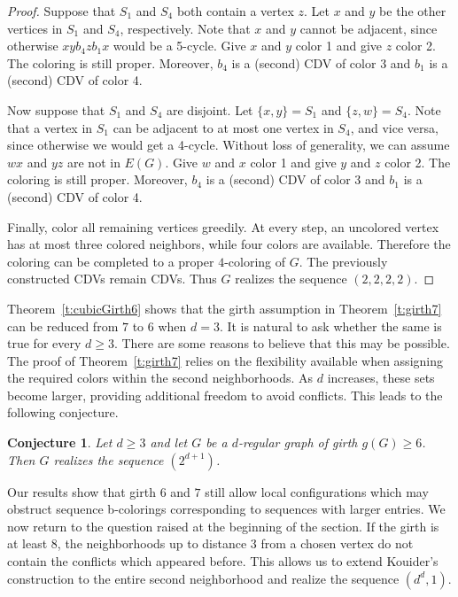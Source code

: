 \documentclass{article}
\newtheorem{conjecture}[theorem]{Conjecture}
\theoremstyle{definition}
\begin{document}
\begin{proof}
Suppose that $S_1$ and $S_4$ both contain a vertex $z$.
Let $x$ and $y$ be the other vertices in $S_1$ and $S_4$, respectively.
Note that $x$ and $y$ cannot be adjacent, since otherwise $xyb_4zb_1x$ would be a 5-cycle.
Give $x$ and $y$ color 1 and give $z$ color 2.
The coloring is still proper.
Moreover, $b_4$ is a (second) CDV of color 3 and $b_1$ is a (second) CDV of color 4.

Now suppose that $S_1$ and $S_4$ are disjoint.
Let $\{x,y\}=S_1$ and $\{z,w\}=S_4$.
Note that a vertex in $S_1$ can be adjacent to at most one vertex in $S_4$, and vice versa, since otherwise we would get a 4-cycle.
Without loss of generality, we can assume $wx$ and $yz$ are not in $E(G)$.
Give $w$ and $x$ color 1 and give $y$ and $z$ color 2.
The coloring is still proper.
Moreover, $b_4$ is a (second) CDV of color 3 and $b_1$ is a (second) CDV of color 4.

\smallskip

Finally, color all remaining vertices greedily. At every step, an uncolored vertex has at most three colored neighbors, while four colors are available. Therefore the coloring can be completed to a proper $4$-coloring of $G$. The previously constructed CDVs remain CDVs. Thus $G$ realizes the sequence $(2,2,2,2)$.
\end{proof}

\medskip

Theorem~\ref{t:cubicGirth6} shows that the girth assumption in Theorem~\ref{t:girth7} can be reduced from $7$ to $6$ when $d=3$. It is natural to ask whether the same is true for every $d\geq 3$. There are some reasons to believe that this may be possible. The proof of Theorem~\ref{t:girth7} relies on the flexibility available when assigning the required colors within the second neighborhoods. As $d$ increases, these sets become larger, providing additional freedom to avoid conflicts. This leads to the following conjecture.

\begin{conjecture}\label{c:girth6}
Let $d\geq 3$ and let $G$ be a $d$-regular graph of girth $g(G)\ge 6$.
Then $G$ realizes the sequence $(2^{d+1})$.
\end{conjecture}

Our results %
show that girth $6$ and $7$ still allow local configurations which may obstruct sequence b-colorings corresponding to sequences with larger entries. We now return to the question raised at the beginning of the section. If the girth is at least $8$, the neighborhoods up to distance 3 from a chosen vertex do not contain the conflicts which appeared before. This allows us to extend Kouider's construction to the entire second neighborhood and realize the sequence $(d^d,1)$.
\end{document}
